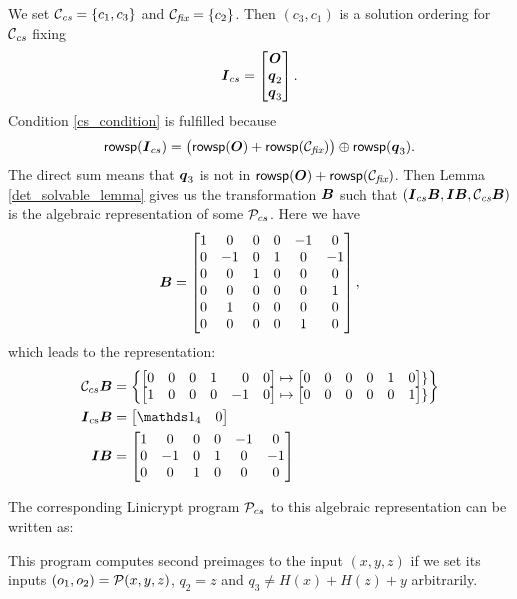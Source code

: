 We set $\Ccs = \{ c_1, c_3 \}$ and $\Cfix = \{c_2\}$.
Then $(c_3, c_1)$ is a solution ordering for $\Ccs$ fixing 
\[
\I_{cs} = \begin{bmatrix}\O \\ \vq_2 \\ \vq_3 \end{bmatrix}.
\]
Condition \eqref{cs_condition} is fulfilled because
\[
\rowsp(\I_{cs}) = \big(\rowsp(\O) + \rowsp(\Cfix)\big) \oplus \rowsp(\vq_3).
\]
The direct sum means that $\vq_3$ is not in $\rowsp(\O) + \rowsp(\Cfix)$.
Then Lemma \ref{det_solvable_lemma} gives us the transformation $\B$
such that $(\I_{cs} \B, \I \B, \Ccs \B)$
is the algebraic representation of some $\P_{cs}$.
Here we have
\[
\B = 
\begin{bmatrix}
1 & 0 & 0 & 0 &-1 & 0 \\
0 &-1 & 0 & 1 & 0 &-1 \\
0 & 0 & 1 & 0 & 0 & 0 \\
0 & 0 & 0 & 0 & 0 & 1 \\
0 & 1 & 0 & 0 & 0 & 0 \\
0 & 0 & 0 & 0 & 1 & 0
\end{bmatrix},
\]
which leads to the representation:
\begin{align*}
    \C_{cs} \B &= \begin{Bmatrix}
        \m{0 & 0 & 0 & 1 &\phantom{-}0 & 0} \mapsto \m{0 & 0 & 0 & 0 & 1 & 0} \} \\
        \m{1 & 0 & 0 & 0 &-1 & 0} \mapsto \m{0 & 0 & 0 & 0 & 0 & 1} \}
    \end{Bmatrix} \\
    \I_\textrm{cs} \B &= \m{\Id_4 & 0} \\
    \I \B &= \begin{bmatrix}
1 & 0 & 0 & 0 &-1 & 0 \\
0 &-1 & 0 & 1 & 0 &-1 \\
0 & 0 & 1 & 0 & 0 & 0
    \end{bmatrix}    
\end{align*}

The corresponding Linicrypt program $\P_{cs}$ to this algebraic representation can be written as:

This program computes second preimages to the input $(x,y,z)$
if we set its inputs $(o_1, o_2) = \P(x,y,z)$, $q_2 = z$ and $q_3 \neq H(x) + H(z) + y$ arbitrarily.

